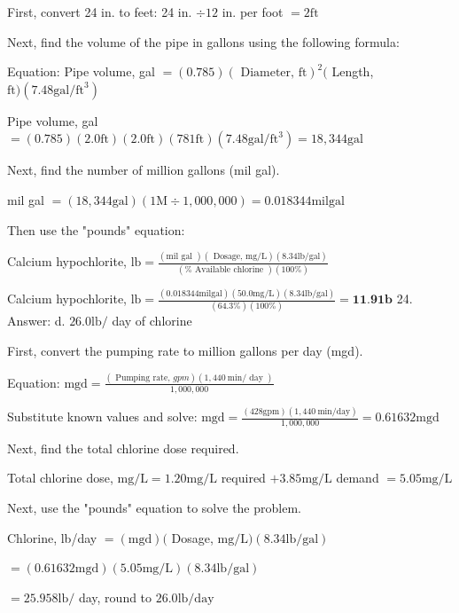 \documentclass[10pt]{article}
\begin{document}
\begin{enumerate}
First, convert 24 in. to feet: 24 in. $\div 12$ in. per foot $=2 \mathrm{ft}$

Next, find the volume of the pipe in gallons using the following formula:

Equation: Pipe volume, gal $=(0.785)(\text { Diameter, } \mathrm{ft})^{2}($ Length, $\mathrm{ft})\left(7.48 \mathrm{gal} / \mathrm{ft}^{3}\right)$

Pipe volume, gal $=(0.785)(2.0 \mathrm{ft})(2.0 \mathrm{ft})(781 \mathrm{ft})\left(7.48 \mathrm{gal} / \mathrm{ft}^{3}\right)=18,344 \mathrm{gal}$

Next, find the number of million gallons (mil gal).

mil gal $=(18,344 \mathrm{gal})(1 \mathrm{M} \div 1,000,000)=0.018344 \mathrm{mil} \mathrm{gal}$

Then use the "pounds" equation:

Calcium hypochlorite, $\mathrm{lb}=\frac{(\mathrm{mil} \text { gal })(\text { Dosage, } \mathrm{mg} / \mathrm{L})(8.34 \mathrm{lb} / \mathrm{gal})}{(\% \text { Available chlorine })(100 \%)}$

Calcium hypochlorite, $\mathrm{lb}=\frac{(0.018344 \mathrm{mil} \mathrm{gal})(50.0 \mathrm{mg} / \mathrm{L})(8.34 \mathrm{lb} / \mathrm{gal})}{(64.3 \%)(100 \%)}=\mathbf{1 1 . 9} \mathbf{1 b}$ 24. Answer: d. $26.0 \mathrm{lb} /$ day of chlorine

First, convert the pumping rate to million gallons per day (mgd).

Equation: $\mathrm{mgd}=\frac{(\text { Pumping rate, } g p m)(1,440 \mathrm{~min} / \text { day })}{1,000,000}$

Substitute known values and solve: $\mathrm{mgd}=\frac{(428 \mathrm{gpm})(1,440 \mathrm{~min} / \mathrm{day})}{1,000,000}=0.61632 \mathrm{mgd}$

Next, find the total chlorine dose required.

Total chlorine dose, $\mathrm{mg} / \mathrm{L}=1.20 \mathrm{mg} / \mathrm{L}$ required $+3.85 \mathrm{mg} / \mathrm{L}$ demand $=5.05 \mathrm{mg} / \mathrm{L}$

Next, use the "pounds" equation to solve the problem.

Chlorine, lb/day $=(\mathrm{mgd})($ Dosage, $\mathrm{mg} / \mathrm{L})(8.34 \mathrm{lb} / \mathrm{gal})$

$=(0.61632 \mathrm{mgd})(5.05 \mathrm{mg} / \mathrm{L})(8.34 \mathrm{lb} / \mathrm{gal})$

$=25.958 \mathrm{lb} /$ day, round to $26.0 \mathrm{lb} / \mathrm{day}$


\end{enumerate}
\end{document}
